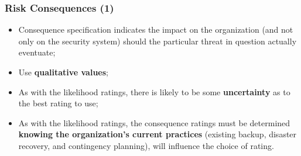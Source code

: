 \documentclass[xcolor ={table,usenames,dvipsnames}]{beamer}
\theoremstyle{definition}
\begin{document}
	\begin{frame}
		\frametitle{Risk Consequences (1)}
		\begin{itemize}
			\item Consequence specification indicates the impact on the organization (and not only on the security system) should the particular threat in question actually eventuate;
			\item Use \textbf{qualitative values};
			\item As with the likelihood ratings, there is likely to be some \textbf{uncertainty} as to the best rating to use;
			\item As with the likelihood ratings, the consequence ratings must be determined \textbf{knowing the organization’s current practices} (existing backup, disaster recovery, and contingency planning), will influence the choice of rating.
		\end{itemize}
	\end{frame}
	
\end{document}

